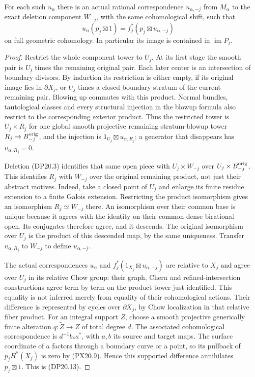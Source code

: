 \begin{lemma}
\label{r20dp:generator}
For each such $u_\alpha$ there is an actual rational correspondence
$u_{\alpha,-j}$ from $M_\alpha$ to the exact deletion component
$W_{-j}$, with the same cohomological shift, such that
\[
 u_\alpha(p_j\boxtimes1)=
       f_j^*(p_j\boxtimes u_{\alpha,-j})
 \tag{DP20.13}
\]
on full geometric cohomology. In particular its image is contained
in $\operatorname{im}P_j$.
\end{lemma}

\begin{proof}
Restrict the whole component tower to $U_j$. At its first stage
the smooth pair is $U_j$ times the remaining original pair.
Each later center is an intersection of boundary divisors.
By induction its restriction is either empty, if its original
image lies in $\partial X_j$, or $U_j$ times a closed boundary
stratum of the current remaining pair. Blowing up commutes with
this product. Normal bundles, tautological classes and every
structural injection in the blowup formula also restrict to
the corresponding exterior product. Thus the restricted tower
is $U_j\times R_j$ for one global smooth projective remaining
stratum-blowup tower $R_j\to B_{-j}^{\rm orig}$, and the
injection is $1_{U_j}\boxtimes u_{\alpha,R_j}$; a generator
that disappears has $u_{\alpha,R_j}=0$.

Deletion (DP20.3) identifies that same open piece with
$U_j\times W_{-j}$ over $U_j\times B_{-j}^{\rm orig}$.
This identifies $R_j$ with $W_{-j}$ over the original remaining
product, not just their abstract motives. Indeed, take a closed
point of $U_j$ and enlarge its finite residue extension to a
finite Galois extension. Restricting the product isomorphism
gives an isomorphism $R_j\simeq W_{-j}$ there. An isomorphism
over their common base is unique because it agrees with the
identity on their common dense birational open. Its conjugates
therefore agree, and it descends. The original isomorphism over
$U_j$ is the product of this descended map, by the same
uniqueness. Transfer $u_{\alpha,R_j}$ to $W_{-j}$ to define
$u_{\alpha,-j}$.

The actual correspondences $u_\alpha$ and
$f_j^*(1_{X_j}\boxtimes u_{\alpha,-j})$ are relative to $X_j$
and agree over $U_j$ in its relative Chow group: their graph,
Chern and refined-intersection constructions agree term by term
on the product tower just identified. This equality is not
inferred merely from equality of their cohomological actions.
Their difference
is represented by cycles over $\partial X_j$, by Chow
localization in that relative fiber product. For an integral
support $Z$, choose a smooth projective generically finite
alteration $q:\widetilde Z\to Z$ of total degree $d$.
The associated cohomological correspondence is
$d^{-1}b_*a^*$, with $a,b$ its source and target maps.
The surface coordinate of $a$ factors through a boundary curve
or a point, so its pullback of $p_jH^*(X_j)$ is zero by
(PX20.9). Hence this supported difference annihilates
$p_j\boxtimes1$. This is (DP20.13).


\end{proof}
